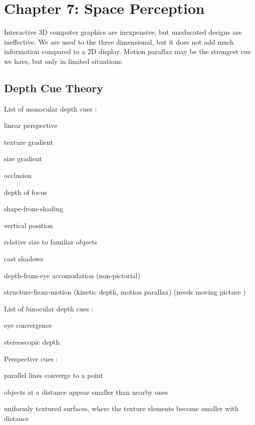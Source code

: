 \section{Chapter 7: Space Perception}
\graphicspath{ {pngs/ch7/} }

\secttoc

Interactive 3D computer graphics are inexpensive, but uneducated designs are
ineffective. We are used to the three dimensional, but it does not add much
information compared to a 2D display. Motion parallax may be the strongest cue
we have, but only in limited situations.

\begin{mdframed}
\subsection{Depth Cue Theory}
\begin{multicols}{2}
\begin{compactdesc}
\item[List of monocular depth cues]:
    \begin{compactenum}
    \item linear perspective
    \item texture gradient
    \item size gradient
    \item occlusion
    \item depth of focus
    \item shape-from-shading
    \item vertical position
    \item relative size to familiar objects
    \item cast shadows
    \item depth-from-eye accomodation (non-pictorial)
    \item structure-from-motion (kinetic depth, motion parallax) (needs moving picture )
    \end{compactenum}
\item[List of binocular depth cues]:
    \begin{compactenum}
    \item eye convergence
    \item stereoscopic depth
    \end{compactenum}
\item[Perspective cues] :
    \begin{compactenum}
    \item parallel lines converge to a point
    \item objects at a distance appear smaller than nearby ones
    \item uniformly textured surfaces, where the texture elements become
        smaller with distance
    \end{compactenum}

\end{compactdesc}
\end{multicols}
\end{mdframed}
